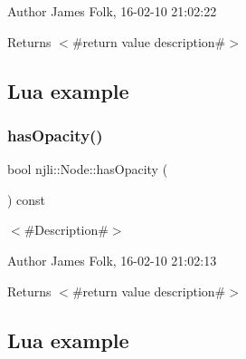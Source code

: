 \begin{DoxyAuthor}{Author}
James Folk, 16-\/02-\/10 21\+:02\+:22
\end{DoxyAuthor}
\begin{DoxyReturn}{Returns}
$<$\#return value description\#$>$
\end{DoxyReturn}
\hypertarget{classnjli_1_1_steering_behavior_wander_ex1}{}\subsection{Lua example}\label{classnjli_1_1_steering_behavior_wander_ex1}

\begin{DoxyCodeInclude}
\end{DoxyCodeInclude}
\mbox{\label{classnjli_1_1_node_aefe134d367769f34fff2c6eebbba519d}} 
\subsubsection{\texorpdfstring{has\+Opacity()}{hasOpacity()}}
{\footnotesize\ttfamily bool njli\+::\+Node\+::has\+Opacity (\begin{DoxyParamCaption}{ }\end{DoxyParamCaption}) const}



$<$\#\+Description\#$>$ 

\begin{DoxyAuthor}{Author}
James Folk, 16-\/02-\/10 21\+:02\+:13
\end{DoxyAuthor}
\begin{DoxyReturn}{Returns}
$<$\#return value description\#$>$
\end{DoxyReturn}
\hypertarget{classnjli_1_1_steering_behavior_wander_ex1}{}\subsection{Lua example}\label{classnjli_1_1_steering_behavior_wander_ex1}

\begin{DoxyCodeInclude}
\end{DoxyCodeInclude}
\mbox{\label{classnjli_1_1_node_a4151e924a1b2b558976c062345d7edd6}} 
